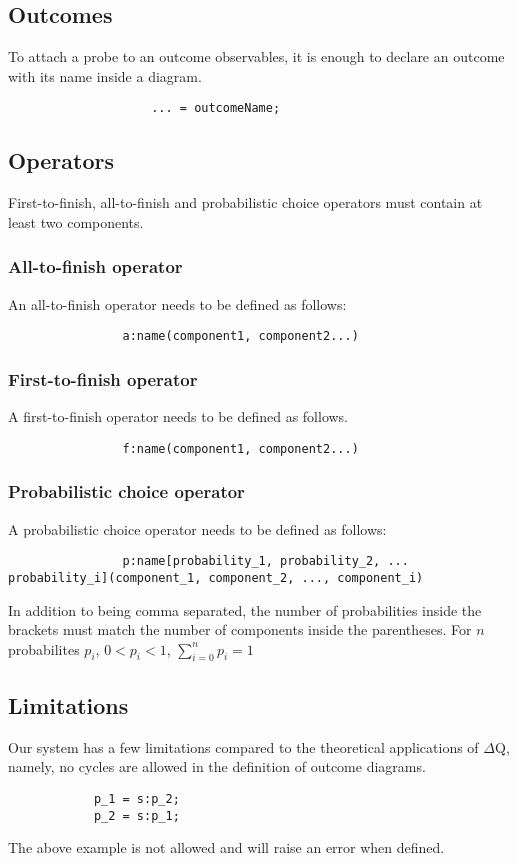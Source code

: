         \subsection{Outcomes}
            To attach a probe to an outcome observables, it is enough to declare an outcome with its name inside a diagram.
                \begin{verbatim}
                    ... = outcomeName;
                \end{verbatim}
        \subsection{Operators}
            First-to-finish, all-to-finish and probabilistic choice operators must contain at least two components.
              \subsubsection{All-to-finish operator}
            An all-to-finish operator needs to be defined as follows:
            \begin{verbatim}
                a:name(component1, component2...)
            \end{verbatim}

        \subsubsection{First-to-finish operator}
            A first-to-finish operator needs to be defined as follows.
            \begin{verbatim}
                f:name(component1, component2...)
            \end{verbatim} 

        \subsubsection{Probabilistic choice operator}
            A probabilistic choice operator needs to be defined as follows:
            \begin{verbatim}
                p:name[probability_1, probability_2, ... probability_i](component_1, component_2, ..., component_i) 
            \end{verbatim}
            In addition to being comma separated, the number of probabilities inside the brackets must match the number of components inside the parentheses. For $n$ probabilites $p_i$, $0 < p_i < 1$, $\sum_{i = 0}^{n} p_i = 1$ 
        
            
        \subsection{Limitations}
            Our system has a few limitations compared to the theoretical applications of $\Delta$Q, namely, no cycles are allowed in the definition of outcome diagrams. 
        
        \begin{verbatim}
            p_1 = s:p_2;
            p_2 = s:p_1;
        \end{verbatim}
        The above example is not allowed and will raise an error when defined.  


